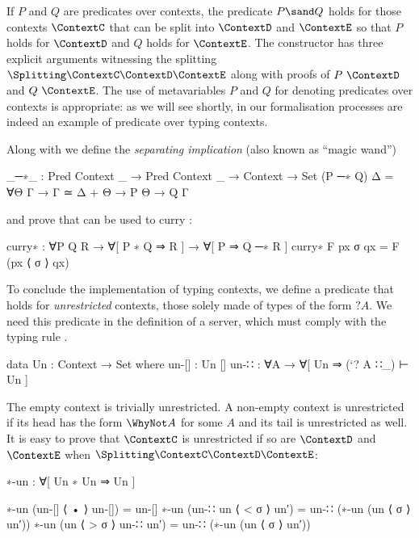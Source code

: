 If $P$ and $Q$ are predicates over contexts, the predicate $P \sand Q$ holds for
those contexts $\ContextC$ that can be split into $\ContextD$ and $\ContextE$ so
that $P$ holds for $\ContextD$ and $Q$ holds for $\ContextE$.
%
The constructor  has three explicit arguments
witnessing the splitting $\Splitting\ContextC\ContextD\ContextE$ along with
proofs of $P~\ContextD$ and $Q~\ContextE$.
%
The use of metavariables $P$ and $Q$ for denoting predicates over contexts is
appropriate: as we will see shortly, in our formalisation processes are indeed
an example of predicate over typing contexts.

Along with  we define the \emph{separating implication} (also
known as ``magic wand'')
\begin{code}
_─∗_ : Pred Context _ → Pred Context _ → Context → Set
(P ─∗ Q) Δ = ∀{Θ Γ} → Γ ≃ Δ + Θ → P Θ → Q Γ
\end{code}
and prove that  can be used to curry :
\begin{code}
curry∗ : ∀{P Q R} → ∀[ P ∗ Q ⇒ R ] → ∀[ P ⇒ Q ─∗ R ]
curry∗ F px σ qx = F (px ⟨ σ ⟩ qx)
\end{code}

To conclude the implementation of typing contexts, we define a predicate
 that holds for \emph{unrestricted} contexts, those solely made
of types of the form $?A$. We need this predicate in the definition of a server,
which must comply with the typing rule \ServerRule.

\begin{code}
data Un : Context → Set where
  un-[]  : Un []
  un-∷   : ∀{A} → ∀[ Un ⇒ (`? A ∷_) ⊢ Un ]
\end{code}

The empty context is trivially unrestricted. A non-empty context is unrestricted
if its head has the form $\WhyNot A$ for some $A$ and its tail is unrestricted
as well.
%
It is easy to prove that $\ContextC$ is unrestricted if so are $\ContextD$ and
$\ContextE$ when $\Splitting\ContextC\ContextD\ContextE$:

\begin{code}
∗-un : ∀[ Un ∗ Un ⇒ Un ]
\end{code}
\begin{code}[hide]
∗-un (un-[] ⟨ • ⟩ un-[])    = un-[]
∗-un (un-∷ un ⟨ < σ ⟩ un′)  = un-∷ (∗-un (un ⟨ σ ⟩ un′))
∗-un (un ⟨ > σ ⟩ un-∷ un′)  = un-∷ (∗-un (un ⟨ σ ⟩ un′))
\end{code}
